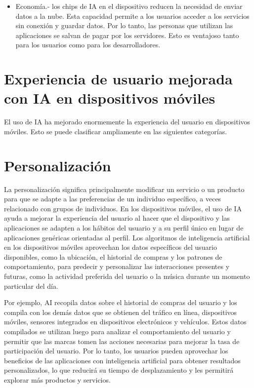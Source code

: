 \begin{itemize}
\item Economía.- los chips de IA en el dispositivo reducen la necesidad de enviar datos a la nube. Esta capacidad permite a los usuarios acceder a los servicios sin conexión y guardar datos. Por lo tanto, las personas que utilizan las aplicaciones se salvan de pagar por los servidores. Esto es ventajoso tanto para los usuarios como para los desarrolladores.
\end{itemize}


\section{Experiencia de usuario mejorada con IA en dispositivos móviles}

El uso de IA ha mejorado enormemente la experiencia del usuario en dispositivos móviles. Esto se puede clasificar ampliamente en las siguientes categorías.

\section{Personalización}

La personalización significa principalmente modificar un servicio o un producto para que se adapte a las preferencias de un individuo específico, a veces relacionado con grupos de individuos. En los dispositivos móviles, el uso de IA ayuda a mejorar la experiencia del usuario al hacer que el dispositivo y las aplicaciones se adapten a los hábitos del usuario y a su perfil único en lugar de aplicaciones genéricas orientadas al perfil. Los algoritmos de inteligencia artificial en los dispositivos móviles aprovechan los datos específicos del usuario disponibles, como la ubicación, el historial de compras y los patrones de comportamiento, para predecir y personalizar las interacciones presentes y futuras, como la actividad preferida del usuario o la música durante un momento particular del día.

Por ejemplo, AI recopila datos sobre el historial de compras del usuario y los compila con los demás datos que se obtienen del tráfico en línea, dispositivos móviles, sensores integrados en dispositivos electrónicos y vehículos. Estos datos compilados se utilizan luego para analizar el comportamiento del usuario y permitir que las marcas tomen las acciones necesarias para mejorar la tasa de participación del usuario. Por lo tanto, los usuarios pueden aprovechar los beneficios de las aplicaciones con inteligencia artificial para obtener resultados personalizados, lo que reducirá su tiempo de desplazamiento y les permitirá explorar más productos y servicios.

